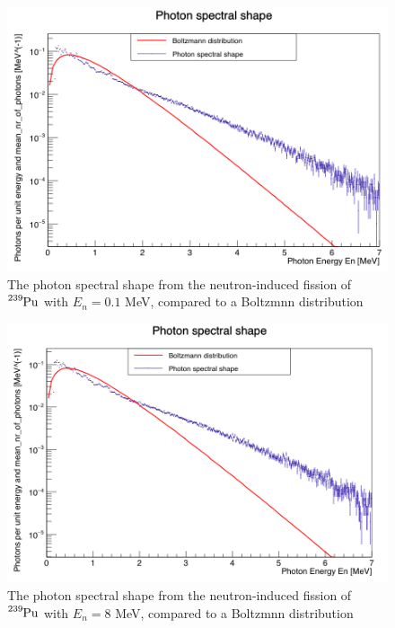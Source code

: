 \documentclass[]{article}
\begin{document}
\begin{figure} [H]
	\centering
	\includegraphics[scale=0.36]{Pu239_0_1_ph_spectral_shape.png}
	\caption{The photon spectral shape from the neutron-induced fission of $\ce{^{239}Pu}$ with $E_n = 0.1$ MeV, compared to a Boltzmnn distribution}
	\label{fig:Pu239_0_1_ph_spectral_shape}
\end{figure}

\begin{figure} [H]
	\centering
	\includegraphics[scale=0.36]{Pu239_8_ph_spectral_shape.png}
	\caption{The photon spectral shape from the neutron-induced fission of $\ce{^{239}Pu}$ with $E_n = 8$ MeV, compared to a Boltzmnn distribution}
	\label{fig:Pu239_8_ph_spectral_shape}
\end{figure}
\end{document}
